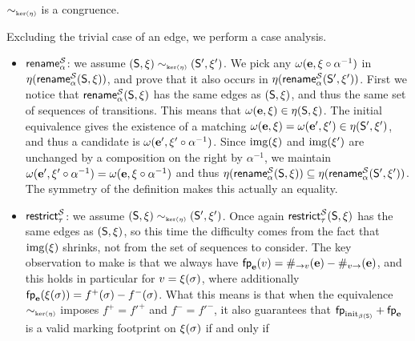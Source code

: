\begin{lemmaE}[][category=proofs]\label{lemma:cong-sys-flow}
  $\sim_{\scriptscriptstyle{\mathrm{ker}(\eta)}}$ is a \hrtext{} congruence. 
\end{lemmaE}
\begin{proofE} Excluding the trivial case of an edge,
  we perform a case analysis.
  \begin{itemize}
    \item \underline{$\mathsf{rename}^{\mathcal{S}}_{{\alpha}}$}: we assume $(\mathsf{S},\xi)
      \sim_{\scriptscriptstyle{\mathrm{ker}(\eta)}} (\mathsf{S}',\xi')$.  We pick any
      $\omega(\mathbf{e},\xi\circ\alpha^{-1})$ in
      $\eta(\mathsf{rename}^{\mathcal{S}}_{{\alpha}}(\mathsf{S},\xi))$, and prove
      that it also occurs in
      $\eta(\mathsf{rename}^{\mathcal{S}}_{{\alpha}}(\mathsf{S}',\xi'))$.  First we
      notice that $\mathsf{rename}^{\mathcal{S}}_{{\alpha}}(\mathsf{S},\xi)$ has the
      same edges as $(\mathsf{S},\xi)$, and thus the same set of
      sequences of transitions.  This means that
      $\omega(\mathbf{e},\xi) \in \eta(\mathsf{S},\xi)$.  The
      initial equivalence gives the existence of a matching
      $\omega(\mathbf{e},\xi) = \omega(\mathbf{e'},\xi') \in
      \eta(\mathsf{S}',\xi')$, and thus a candidate is
      $\omega(\mathbf{e'},\xi'\circ\alpha^{-1})$.  Since
      ${\mathrm{img}({\xi})}$ and ${\mathrm{img}({\xi'})}$ are unchanged by a
      composition on the right by $\alpha^{-1}$, we maintain
      $\omega(\mathbf{e'},\xi'\circ\alpha^{-1}) =
      \omega(\mathbf{e},\xi\circ\alpha^{-1})$ and thus
      $\eta(\mathsf{rename}^{\mathcal{S}}_{{\alpha}}(\mathsf{S},\xi)) \subseteq
      \eta(\mathsf{rename}^{\mathcal{S}}_{{\alpha}}(\mathsf{S}',\xi'))$.  The
      symmetry of the definition makes this actually an equality.
    \item \underline{$\mathsf{restrict}^{\mathcal{S}}_{{\tau}}$}:
      we assume $(\mathsf{S},\xi) \sim_{\scriptscriptstyle{\mathrm{ker}(\eta)}} (\mathsf{S}',\xi')$.
      Once again $\mathsf{restrict}^{\mathcal{S}}_{{\tau}}(\mathsf{S},\xi)$ has the same edges as $(\mathsf{S},\xi)$,
      so this time the difficulty comes from the fact that ${\mathrm{img}({\xi})}$ shrinks,
      not from the set of sequences to consider.
      The key observation to make is that we always have
      $\mathsf{fp}_{\mathbf{e}}(v) = \#_{\to{v}}(\mathbf{e}) - \#_{{v}\to}(\mathbf{e})$,
      and this holds in particular for $v = \xi(\sigma)$,
      where additionally $\mathsf{fp}_{\mathbf{e}}(\xi(\sigma)) = f^+(\sigma) - f^-(\sigma)$.
      What this means is that when the equivalence $\sim_{\scriptscriptstyle{\mathrm{ker}(\eta)}}$
      imposes $f^+ = f'^+$ and $f^- = f'^-$, it also guarantees that
      $\mathsf{fp}_{\mathrm{init}_{\beta({\mathsf{S}})}} + \mathsf{fp}_{\mathbf{e}}$
      is a valid marking footprint on $\xi(\sigma)$ if and only if

\end{itemize}
\end{proofE}
